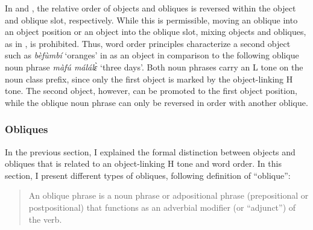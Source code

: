\noindent In  and , the relative order of objects and obliques is reversed within the object and oblique slot, respectively. While this is permissible, moving an oblique into an object position or an object into the oblique slot, mixing objects and obliques, as in , is prohibited. Thus, word order principles characterize a second object such as {\itshape bèfùmbí} `oranges' in  as an object in comparison to the following oblique noun phrase {\itshape màfú málálɛ̀} `three days'. Both noun phrases carry an L tone on the noun class prefix, since only the first object is marked by the object-linking H tone. The second object, however, can be promoted to the first object position, while the oblique noun phrase can only be reversed in order with another oblique.












\subsubsection{Obliques}
\label{sec:OBL}

In the previous section, I explained the formal distinction between objects and obliques that is related to an object-linking H tone and word order.
In this section, I present different types of obliques, following
   definition of ``oblique'':
\begin{quote}
An oblique phrase is a noun phrase or adpositional phrase (prepositional or postpositional) that functions as an adverbial modifier (or ``adjunct'') of the verb. \end{quote}

